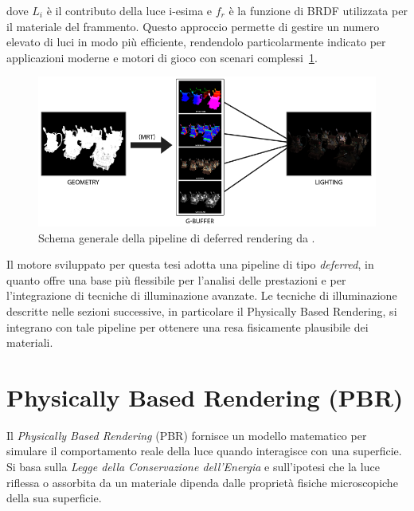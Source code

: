 \documentclass[12pt,a4paper,openright,twoside]{book}
\begin{document}
dove \(L_i\) è il contributo della luce i-esima e \(f_r\) è la funzione di BRDF utilizzata per il materiale del frammento.
Questo approccio permette di gestire un numero elevato di luci in modo più efficiente, rendendolo particolarmente
indicato per applicazioni moderne e motori di gioco con scenari complessi~\ref{fig:deferred-pipeline-example}.
\begin{figure}[H]
   \centering
   \includegraphics[width=.8\linewidth]{figures/deferred_pipeline_example.png}
   \caption{Schema generale della pipeline di deferred rendering da \cite{learnopengl}.}
   \label{fig:deferred-pipeline-example}
\end{figure}
Il motore sviluppato per questa tesi adotta una pipeline di tipo \emph{deferred}, in quanto offre una base più
flessibile per l'analisi delle prestazioni e per l'integrazione di tecniche di illuminazione avanzate.
Le tecniche di illuminazione descritte nelle sezioni successive, in particolare il Physically Based Rendering,
si integrano con tale pipeline per ottenere una resa fisicamente plausibile dei materiali.

\section{Physically Based Rendering (PBR)}
Il \emph{Physically Based Rendering} (PBR) fornisce un modello matematico per simulare il comportamento reale
della luce quando interagisce con una superficie. Si basa sulla \emph{Legge della Conservazione dell'Energia}
e sull'ipotesi che la luce riflessa o assorbita da un materiale dipenda dalle proprietà fisiche microscopiche
della sua superficie.
\end{document}
